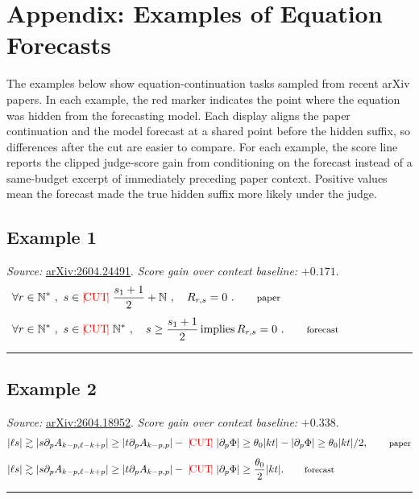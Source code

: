 \documentclass[10pt]{article}
\providecommand{\implies}{\operatorname{implies}}
\begin{document}
\appendix
\section*{Appendix: Examples of Equation Forecasts}
The examples below show equation-continuation tasks sampled from recent arXiv papers. In each example, the red marker indicates the point where the equation was hidden from the forecasting model. Each display aligns the paper continuation and the model forecast at a shared point before the hidden suffix, so differences after the cut are easier to compare.
For each example, the score line reports the clipped judge-score gain from conditioning on the forecast instead of a same-budget excerpt of immediately preceding paper context. Positive values mean the forecast made the true hidden suffix more likely under the judge.

\subsection*{Example 1}
\textit{Source:} \href{https://arxiv.org/abs/2604.24491}{arXiv:2604.24491}. \textit{Score gain over context baseline:} \(+0.171\).
\vspace{0.2em}
{\small
\[
\begin{aligned}
&\mathllap{\forall r\in\mathbb{N}^*\ ,\ s\in}{\color{red}\;|\!\mathrm{CUT}\!|\;}\frac{s_1+1}{2}+\mathbb{N}\ , \quad R_{r,s} = 0 \ . \qquad \text{\footnotesize paper}\\[0.45em]
&\mathllap{\forall r\in\mathbb{N}^*\ ,\ s\in}{\color{red}\;|\!\mathrm{CUT}\!|\;}\mathbb{N}^*\ ,\quad s\geq \frac{s_1+1}{2} \implies R_{r,s}=0 \ . \qquad \text{\footnotesize forecast}
\end{aligned}
\]
}
\vspace{0.4em}\hrule\vspace{0.8em}

\subsection*{Example 2}
\textit{Source:} \href{https://arxiv.org/abs/2604.18952}{arXiv:2604.18952}. \textit{Score gain over context baseline:} \(+0.338\).
\vspace{0.2em}
{\small
\[
\begin{aligned}
|\ell s| \gtrsim |s\partial_pA_{k-p,\ell-k+p}|
\ge |t\partial_p A_{k-p,p}| -{}
&{\color{red}\;|\!\mathrm{CUT}\!|\;}|\partial_p \Phi|
\ge \theta_0 |kt| - |\partial_p \Phi|
\ge \theta_0|kt|/2, \qquad \text{\footnotesize paper}\\[0.45em]
|\ell s| \gtrsim |s\partial_pA_{k-p,\ell-k+p}|
\ge |t\partial_p A_{k-p,p}| -{}
&{\color{red}\;|\!\mathrm{CUT}\!|\;}|\partial_p \Phi|
\ge \frac{\theta_0}{2}|kt|. \qquad \text{\footnotesize forecast}
\end{aligned}
\]
}
\vspace{0.4em}\hrule\vspace{0.8em}
\end{document}
